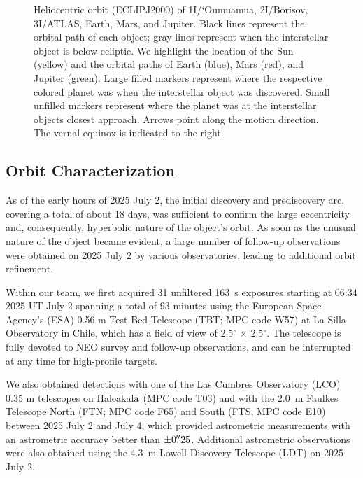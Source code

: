 \documentclass[twocolumn,longbib]{aastex7}
\begin{document}
\begin{CJK*}{UTF8}{gbsn}
\begin{figure}
    \caption{Heliocentric orbit (ECLIPJ2000) of 1I/`Oumuamua, 2I/Borisov, 3I/ATLAS, Earth, Mars, and Jupiter. Black lines represent the orbital path of each object; gray lines represent when the interstellar object is below-ecliptic. We highlight the location of the Sun (yellow) and the orbital paths of Earth (blue), Mars (red), and Jupiter (green). Large filled markers represent where the respective colored planet was when the interstellar object was discovered. Small unfilled markers represent where the planet was at the interstellar objects closest approach. Arrows point along the motion direction. The vernal equinox is indicated to the right.}
    \label{fig:orbit}
\end{figure}

\subsection{Orbit Characterization}
As of the early hours of 2025 July 2, the initial discovery and prediscovery arc, covering a total of about 18 days, was sufficient to confirm the large eccentricity and, consequently, hyperbolic nature of the object's orbit. As soon as the unusual nature of the object became evident, a large number of follow-up observations were obtained on 2025 July 2 by various observatories, leading to additional orbit refinement.


Within our team, we first acquired 31 unfiltered 163~s exposures starting at 06:34 2025 UT July 2 spanning a total of 93 minutes using the European Space Agency's (ESA) 0.56 m Test Bed Telescope (TBT; MPC code W57) at La Silla Observatory in Chile, which has a field of view of 2.5$^{\circ}$ $\times$ 2.5$^{\circ}$. The telescope is fully devoted to NEO survey and follow-up observations, and can be interrupted at any time for high-profile targets.

We also obtained detections with one of the Las Cumbres Observatory (LCO) 0.35 m telescopes on Haleakal${\rm\bar{a}}$ (MPC code T03) and with the 2.0~m Faulkes Telescope North (FTN; MPC code F65) and South (FTS, MPC code E10) between 2025 July 2 and July 4, which provided astrometric measurements with an astrometric accuracy better than $\pm0\mbox{$.\!\!^{\prime\prime}$}25$. Additional astrometric observations were also obtained using the 4.3~m Lowell Discovery Telescope (LDT) on 2025 July 2.


\end{CJK*}
\end{document}
